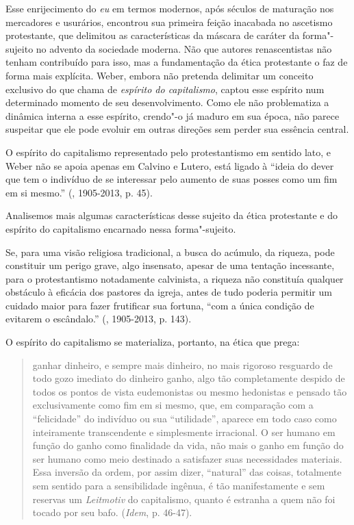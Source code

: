 Esse enrijecimento do \emph{eu} em termos modernos, após séculos de
maturação nos mercadores e usurários, encontrou sua primeira feição
inacabada no ascetismo protestante, que delimitou as características da
máscara de caráter da forma"-sujeito no advento da sociedade moderna. Não
que autores renascentistas não tenham contribuído para isso, mas a
fundamentação da ética protestante o faz de forma mais explícita. Weber,
embora não pretenda delimitar um conceito exclusivo do que chama de
\emph{espírito do capitalismo}, captou esse espírito num determinado
momento de seu desenvolvimento. Como ele não problematiza a dinâmica
interna a esse espírito, crendo"-o já maduro em sua época, não parece
suspeitar que ele pode evoluir em outras direções sem perder sua
essência central.

O espírito do capitalismo representado pelo protestantismo em sentido
lato, e Weber não se apoia apenas em Calvino e Lutero, está ligado à
``ideia do dever que tem o indivíduo de se interessar pelo aumento de
suas posses como um fim em si mesmo.'' (, 1905-2013, p. 45).

Analisemos mais algumas características desse sujeito da ética
protestante e do espírito do capitalismo encarnado nessa forma"-sujeito.

Se, para uma visão religiosa tradicional, a busca do acúmulo, da
riqueza, pode constituir um perigo grave, algo insensato, apesar de uma
tentação incessante, para o protestantismo notadamente calvinista, a
riqueza não constituía qualquer obstáculo à eficácia dos pastores da
igreja, antes de tudo poderia permitir um cuidado maior para fazer
frutificar sua fortuna, ``com a única condição de evitarem o
escândalo.'' (, 1905-2013, p. 143).

O espírito do capitalismo se materializa, portanto, na ética que prega:

\begin{quote}
ganhar dinheiro, e sempre mais dinheiro, no mais rigoroso resguardo de
todo gozo imediato do dinheiro ganho, algo tão completamente despido de
todos os pontos de vista eudemonistas ou mesmo hedonistas e pensado tão
exclusivamente como fim em si mesmo, que, em comparação com a
``felicidade'' do indivíduo ou sua ``utilidade'', aparece em todo caso
como inteiramente transcendente e simplesmente irracional. O ser humano
em função do ganho como finalidade da vida, não mais o ganho em função
do ser humano como meio destinado a satisfazer suas necessidades
materiais. Essa inversão da ordem, por assim dizer, ``natural'' das
coisas, totalmente sem sentido para a sensibilidade ingênua, é tão
manifestamente e sem reservas um \emph{Leitmotiv} do capitalismo, quanto
é estranha a quem não foi tocado por seu bafo. (\emph{Idem}, p. 46-47).
\end{quote}

